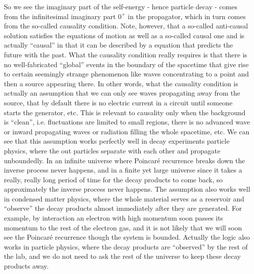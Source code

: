 \documentclass[hyperref, a4paper]{article}
\newenvironment{qanda}{\setlength{\parindent}{0pt}}{\bigskip}
\begin{document}
\begin{qanda}
So we see the imaginary part of the self-energy - hence particle decay - comes from the infinitesimal imaginary part $0^+$ in the propagator, which in turn comes from the so-called causality condition.
Note, however, that a so-called anti-causal solution satisfies the equations of motion as well as a so-called causal one 
and is actually ``causal'' in that it can be described by a equation that predicts the future with the past.
What the causality condition really requires is that there is no well-fabricated ``global'' events in the boundary of the spacetime that give rise to 
certain seemingly strange phenomenon like waves concentrating to a point and then a source appearing there.
In other words, what the causality condition is actually an assumption that we can only see waves propagating away from the source, that by default there is no electric current in a circuit until someone starts the generator, etc.
This is relevant to causality only when the background is ``clean'', i.e. fluctuations are limited to small regions, there is no advanced wave or inward propagating waves or radiation filling the whole spacetime, etc.  
We can see that this assumption works perfectly well in decay experiments particle physics, where the out particles separate with each other and propagate unboundedly.
In an infinite universe where Poincaré recurrence breaks down the inverse process never happens, and in a finite yet large universe since it takes a really, really long period of time for the decay products to come back, so approximately the inverse process never happens.
The assumption also works well in condensed matter physics, where the whole material serves as a reservoir and ``observe'' the decay products almost immediately after they are generated. 
For example, by interaction an electron with high momentum soon passes its momentum to the rest of the electron gas, and it is not likely that we will soon see the Poincaré recurrence though the system is bounded.
Actually the logic also works in particle physics, where the decay products are ``observed'' by the rest of the lab, and we do not need to ask the rest of the universe to keep these decay products away.


\end{qanda}
\end{document}

